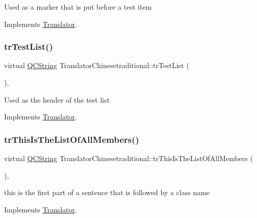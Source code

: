 Used as a marker that is put before a test item 

Implements \mbox{\hyperlink{class_translator}{Translator}}.

\mbox{\label{class_translator_chinesetraditional_a08c527aab589d7798710e841c0d79294}} 
\subsubsection{\texorpdfstring{trTestList()}{trTestList()}}
{\footnotesize\ttfamily virtual \mbox{\hyperlink{class_q_c_string}{Q\+C\+String}} Translator\+Chinesetraditional\+::tr\+Test\+List (\begin{DoxyParamCaption}{ }\end{DoxyParamCaption})\hspace{0.3cm}{\ttfamily [inline]}, {\ttfamily [virtual]}}

Used as the header of the test list 

Implements \mbox{\hyperlink{class_translator}{Translator}}.

\mbox{\label{class_translator_chinesetraditional_a2c635ff592e3ca67083d33a8aae4d6be}} 
\subsubsection{\texorpdfstring{trThisIsTheListOfAllMembers()}{trThisIsTheListOfAllMembers()}}
{\footnotesize\ttfamily virtual \mbox{\hyperlink{class_q_c_string}{Q\+C\+String}} Translator\+Chinesetraditional\+::tr\+This\+Is\+The\+List\+Of\+All\+Members (\begin{DoxyParamCaption}{ }\end{DoxyParamCaption})\hspace{0.3cm}{\ttfamily [inline]}, {\ttfamily [virtual]}}

this is the first part of a sentence that is followed by a class name 

Implements \mbox{\hyperlink{class_translator}{Translator}}.

